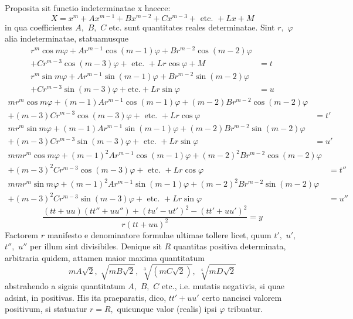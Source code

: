 \documentclass[14pt]{memoir}
\theoremstyle{plain}
\theoremstyle{remark}
\begin{document}
Proposita sit functio indeterminatae x haecce: 
\[X = x^m + Ax^{m-1}+Bx^{m-2}+Cx^{m-3}+\text{ etc. }+Lx+M\]
in qua coefficientes \(A,\) \(B,\) \(C\) etc. sunt quantitates reales determinatae. Sint \(r,\) \(\varphi\) alia indeterminatae, statuamusque 
\begin{align*}
r^m\cos m\varphi + A r^{m-1}\cos(m-1)\varphi+Br^{m-2}\cos(m-2)\varphi & \\
+Cr^{m-3}\cos(m-3)\varphi+\text{ etc. }+Lr\cos\varphi+M&=t\\
r^m\sin m\varphi+Ar^{m-1}\sin(m-1)\varphi+Br^{m-2}\sin(m-2)\varphi&\\
+Cr^{m-3}\sin(m-3)\varphi+\text{etc.}+Lr\sin\varphi&=u \end{align*}
\begin{align*}
mr^m\cos m\varphi +(m-1)Ar^{m-1}\cos(m-1)\varphi+(m-2)Br^{m-2}\cos(m-2)\varphi&\\ +(m-3)Cr^{m-3}\cos(m-3)\varphi+\text{ etc. }+Lr\cos\varphi &= t'\\
mr^m\sin m\varphi +(m-1)Ar^{m-1}\sin(m-1)\varphi + (m-2)Br^{m-2}\sin(m-2)\varphi&\\ +(m-3)Cr^{m-3}\sin(m-3)\varphi+\text{ etc. }+Lr\sin\varphi &= u'
\end{align*}
\begin{align*}
mmr^m\cos m\varphi+(m-1)^2Ar^{m-1}\cos(m-1)\varphi+(m-2)^2Br^{m-2}\cos(m-2)\varphi&\\ +(m-3)^2Cr^{m-3}\cos(m-3)\varphi +\text{ etc. }+Lr\cos \varphi &= t''\\
mmr^m\sin m\varphi+(m-1)^2Ar^{m-1}\sin(m-1)\varphi+(m-2)^2Br^{m-2}\sin(m-2)\varphi&\\ + (m-3)^2Cr^{m-3}\sin(m-3)\varphi+\text{ etc. }+Lr\sin\varphi&=u''\end{align*}
\[ \frac{(tt+uu)(tt''+uu'')+(tu'-ut')^2-(tt'+uu')^2}{r(tt+uu)^2} = y \]
Factorem \(r\) manifesto e denominatore formulae ultimae tollere licet, quum \(t',\) \(u',\) \(t'',\) \(u''\) per illum sint divisibiles. Denique sit \(R\) quantitas positiva determinata, arbitraria quidem, attamen maior maxima quantitatum 
\[ mA\surd{2} , \; \sqrt{mB\surd{2}}, \; \sqrt[3]{(mC\surd{2})}, \; \sqrt[4]{mD\surd{2}} \] 
abstrahendo a signis quantitatum \(A,\) \(B,\) \(C\) etc., i.e. mutatis negativis, si quae adsint, in positivas. His ita praeparatis, dico, \(tt'+uu'\) certo nancisci valorem 
positivum, si statuatur \(r=R,\) quicunque valor (realis) ipsi \(\varphi\) tribuatur. 
\end{document}
